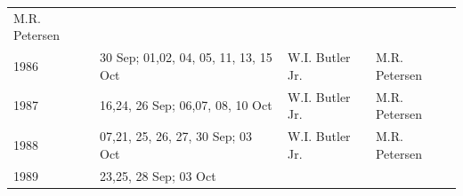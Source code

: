 \documentclass[]{article}
\begin{document}
\begin{longtable}[]{@{}llll@{}}
\begin{minipage}[t]{0.20\columnwidth}
M.R. Petersen\strut
\end{minipage}\tabularnewline
\begin{minipage}[t]{0.12\columnwidth}\raggedright\strut
1986\strut
\end{minipage} & \begin{minipage}[t]{0.38\columnwidth}\raggedright\strut
30 Sep; 01,02, 04, 05, 11, 13, 15 Oct\strut
\end{minipage} & \begin{minipage}[t]{0.18\columnwidth}\raggedright\strut
W.I. Butler Jr.\strut
\end{minipage} & \begin{minipage}[t]{0.20\columnwidth}\raggedright\strut
M.R. Petersen\strut
\end{minipage}\tabularnewline
\begin{minipage}[t]{0.12\columnwidth}\raggedright\strut
1987\strut
\end{minipage} & \begin{minipage}[t]{0.38\columnwidth}\raggedright\strut
16,24, 26 Sep; 06,07, 08, 10 Oct\strut
\end{minipage} & \begin{minipage}[t]{0.18\columnwidth}\raggedright\strut
W.I. Butler Jr.\strut
\end{minipage} & \begin{minipage}[t]{0.20\columnwidth}\raggedright\strut
M.R. Petersen\strut
\end{minipage}\tabularnewline
\begin{minipage}[t]{0.12\columnwidth}\raggedright\strut
1988\strut
\end{minipage} & \begin{minipage}[t]{0.38\columnwidth}\raggedright\strut
07,21, 25, 26, 27, 30 Sep; 03 Oct\strut
\end{minipage} & \begin{minipage}[t]{0.18\columnwidth}\raggedright\strut
W.I. Butler Jr.\strut
\end{minipage} & \begin{minipage}[t]{0.20\columnwidth}\raggedright\strut
M.R. Petersen\strut
\end{minipage}\tabularnewline
\begin{minipage}[t]{0.12\columnwidth}\raggedright\strut
1989\strut
\end{minipage} & \begin{minipage}[t]{0.38\columnwidth}\raggedright\strut
23,25, 28 Sep; 03 Oct\strut
\end{minipage} & \begin{minipage}[t]{0.18\columnwidth}\raggedright\strut

\end{minipage}
\end{longtable}
\end{document}
